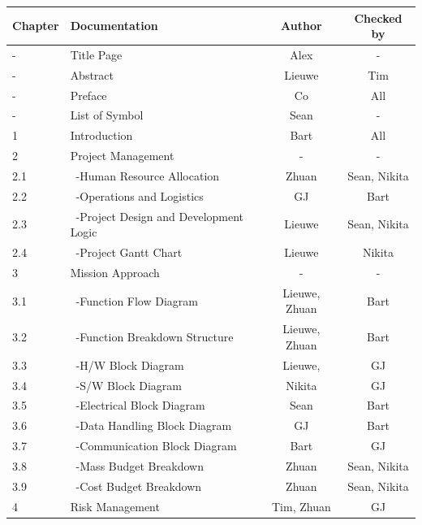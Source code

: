 \newpage
\begin{center}
\begin{longtable}{|l|l|c|c|}\hline
 Chapter & Documentation                      & Author & Checked by \\\hline\hline
 -       & Title Page                           & Alex & - \\\hline     -       & Abstract                             & Lieuwe & Tim \\\hline    
 -       & Preface                              & Co & All \\\hline
 -       & List of Symbol                       & Sean & - \\\hline\hline
 1       & Introduction                         & Bart & All \\\hline\hline
 2       & Project Management                   & - & -\\\hline
 2.1     & \ -Human Resource Allocation         & Zhuan & Sean, Nikita \\\hline
 2.2     & \ -Operations and Logistics          & GJ & Bart \\\hline
 2.3     & \ -Project Design and Development Logic & Lieuwe & Sean, Nikita \\\hline
 2.4     & \ -Project Gantt Chart               & Lieuwe & Nikita \\\hline\hline
 3       & Mission Approach                     & - & -\\\hline
 3.1     & \ -Function Flow Diagram             & Lieuwe, Zhuan & Bart \\\hline
 3.2     & \ -Function Breakdown Structure      & Lieuwe, Zhuan & Bart \\\hline
 3.3     & \ -H/W Block Diagram                 & Lieuwe, & GJ \\\hline
 3.4     & \ -S/W Block Diagram                 & Nikita & GJ \\\hline
 3.5     & \ -Electrical Block Diagram          & Sean & Bart \\\hline
 3.6     & \ -Data Handling Block Diagram       & GJ & Bart\\\hline
 3.7     & \ -Communication Block Diagram       & Bart & GJ\\\hline
 3.8     & \ -Mass Budget Breakdown             & Zhuan & Sean, Nikita \\\hline
 3.9     & \ -Cost Budget Breakdown             & Zhuan & Sean, Nikita \\\hline\hline
 4       & Risk Management                      & Tim, Zhuan & GJ \\\hline\hline

\end{longtable}
\end{center}
